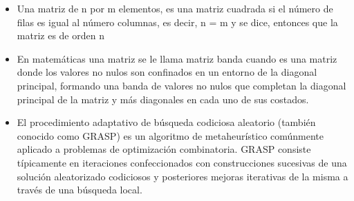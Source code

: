 \begin{itemize}

\item Una matriz de n por m elementos, es una matriz cuadrada si el número de filas es igual al número columnas, es decir, n = m y se dice, entonces que la matriz es de orden n

\item En matemáticas una matriz se le llama matriz banda cuando es una matriz donde los valores no nulos son confinados en un entorno de la diagonal principal, formando una banda de valores no nulos que completan la diagonal principal de la matriz y más diagonales en cada uno de sus costados.

\item El procedimiento adaptativo de búsqueda codiciosa aleatorio (también conocido como GRASP) es un algoritmo de metaheurístico comúnmente aplicado a problemas de optimización combinatoria. GRASP consiste típicamente en iteraciones confeccionados con construcciones sucesivas de una solución aleatorizado codiciosos y posteriores mejoras iterativas de la misma a través de una búsqueda local.

\end{itemize}






